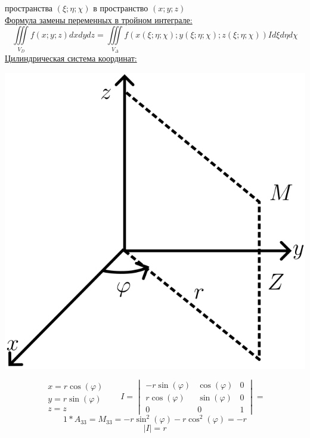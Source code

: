 \documentclass[12pt]{article}
\let\ORIincludegraphics\includegraphics
\renewcommand{\includegraphics}[2][]{\ORIincludegraphics[scale=0.65,#1]{#2}}
\let\oldiiint\iiint
\renewcommand{\iiint}{\oldiiint\limits}
\begin{document}
  пространства $(\xi;\eta;\chi)$ в пространство $(x;y;z)$\\
  \underline{Формула замены переменных в тройном интеграле:}
  \[\iiint_{V_D}f(x;y;z)dxdydz = \iiint_{V_\Delta}f(x(\xi;\eta;\chi);y(\xi;\eta;\chi);z(\xi;\eta;\chi))I d\xi d\eta d\chi\]
  \underline{Цилиндрическая система координат:}\\
  \begin{minipage}{0.45\textwidth}
    \includegraphics[scale=0.8]{8.25.1.png}
  \end{minipage}
  \hspace{1em}
  \begin{minipage}{0.55\textwidth}
    \[\begin{matrix}
      x=r\cos(\varphi)\\
      y=r\sin(\varphi)\\
      z=z
    \end{matrix}\hspace{20pt}
    I = \begin{vmatrix}
      -r\sin(\varphi) & \cos(\varphi) & 0\\
      r\cos(\varphi) & \sin(\varphi) & 0 \\
      0 & 0 & 1
    \end{vmatrix} =\]
    \[1 * A_{33}=M_{33}=-r\sin^2(\varphi)-r\cos^2(\varphi)=-r\]
    \[|I|=r\]
  \end{minipage}
  \vspace{1em}
  
\end{document}
